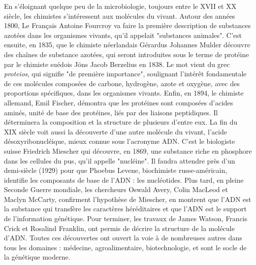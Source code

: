 En s'éloignant quelque peu de la microbiologie, toujours entre le XVII\ieme{} et XX\ieme{} siècle, les chimistes s'intéressent aux molécules du vivant. Autour des années 1800, Le Français Antoine Fourcroy va faire la première description de substances azotées dans les organismes vivants, qu'il appelait "substances animales". C'est ensuite, en 1835, que le chimiste néerlandais Gérardus Johannes Mulder découvre des chaînes de substance azotées, qui seront introduites sous le terme de protéine par le chimiste suédois Jöns Jacob Berzelius en 1838. Le mot vient du grec \textit{proteios}, qui signifie "de première importance", soulignant l'intérêt fondamentale de ces molécules composées de carbone, hydrogène, azote et oxygène, avec des proportions spécifiques, dans les organismes vivants. Enfin, en 1894, le chimiste allemand, Emil Fischer, démontra que les protéines sont composées d'acides aminés, unité de base des protéines, liés par des liaisons peptidiques. Il déterminera la composition et la structure de plusieurs d'entre eux. La fin du XIX\ieme{} siècle voit aussi la découverte d'une autre molécule du vivant, l'acide désoxyribonucléique, mieux connue sous l'acronyme ADN. C'est le biologiste suisse Friedrich Miescher qui découvre, en 1869, une substance riche en phosphore dans les cellules du pus, qu'il appelle "nucléine". Il faudra attendre près d'un demi-siècle (1929) pour que Phoebus Levene, biochimiste russe-américain, identifie les composants de base de l'ADN : les nucléotides. Plus tard, en pleine Seconde Guerre mondiale, les chercheurs Oswald Avery, Colin MacLeod et Maclyn McCarty, confirment l'hypothèse de Miescher, en montrent que l’ADN est la substance qui transfère les caractères héréditaires et que l'ADN est le support de l’information génétique. Pour terminer, les travaux de James Watson, Francis Crick  et Rosalind Franklin, ont permis de décrire la structure de la molécule d'ADN. Toutes ces découvertes ont ouvert la voie à de nombreuses autres dans tous les domaines : médecine, agroalimentaire, biotechnologie, et sont le socle de la génétique moderne.

